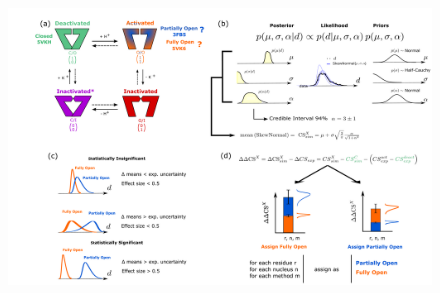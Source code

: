 \documentclass[%
 aip,
 amsmath,amssymb,
 preprint,%
]{revtex4-1}
\begin{document}
\begin{figure}
\includegraphics[width=\textwidth]{Fig1.pdf}%
\caption{\label{general_scheme} \scriptsize
}
\end{figure}
\end{document}
